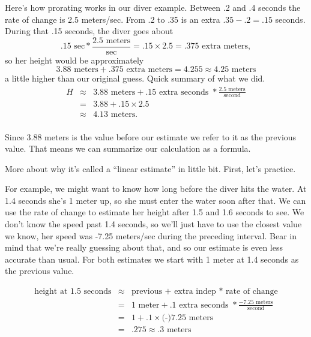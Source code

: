 Here's how prorating works in our diver example. Between .2 and .4 seconds the rate of change is 2.5 meters/sec.  From .2 to .35 is an extra $.35-.2=.15$ seconds.  During that .15 seconds, the diver goes about 
$$.15 \text{ sec} \ast \frac{2.5 \text{ meters}}{\text{sec}}= .15 \times 2.5 = .375 \text{ extra meters},$$
so her height would be approximately
 $$3.88 \text{ meters} + .375 \text{ extra meters} =  4.255 \approx 4.25 \text{ meters}$$  
 a little higher than our original guess.  Quick summary of what we did.
 \begin{eqnarray} \nonumber
H&\approx& 3.88 \text{ meters} + .15\text{ extra seconds } \ast \frac{2.5 \text{ meters}}{\text{second}} \\ \nonumber
&=& 3.88 + .15 \times 2.5\\ \nonumber
&\approx& 4.13\text{ meters}. \\ \nonumber
\end{eqnarray}

Since 3.88 meters is the value before our estimate we refer to it as the previous value.  That means we can summarize our calculation as a formula.

\bigskip
\bigskip

\noindent More about why it's called a ``linear estimate'' in little bit.  First, let's practice.  

For example, we might want to know how long before the diver hits the water.  At 1.4 seconds she's 1 meter up, so she must enter the water soon after that.  We can use the rate of change to estimate her height after 1.5 and 1.6 seconds to see.  We don't know the speed past 1.4 seconds, so we'll just have to use the closest value we know, her speed was -7.25 meters/sec during the preceding interval. Bear in mind that we're really guessing about that, and so our estimate is even less accurate than usual.  For both estimates we start with 1 meter at 1.4 seconds as the previous value.

\begin{eqnarray} \nonumber
\text{height at 1.5 seconds} & \approx & \text{previous + extra indep } \ast \text{ rate of change}  \\ \nonumber
& = &  1 \text{ meter} + .1\text{ extra seconds } \ast \frac{-7.25 \text{ meters}} {\text{second}} \\ \nonumber
&=& 1+.1 \times \text{(-)}7.25 \text{ meters} \\ \nonumber %
&=& .275 \approx .3 \text{ meters}\\ \nonumber
\end{eqnarray}


